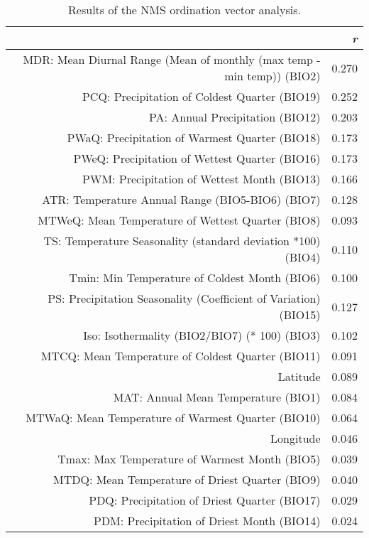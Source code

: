 \begin{table}[ht]
\centering
\begin{tabular}{rr}
  \hline
 & {\emph{r}} \\ 
  \hline
MDR: Mean Diurnal Range (Mean of monthly (max temp - min temp)) (BIO2) & 0.270 \\ 
  PCQ: Precipitation of Coldest Quarter (BIO19) & 0.252 \\ 
  PA: Annual Precipitation (BIO12) & 0.203 \\ 
  PWaQ: Precipitation of Warmest Quarter (BIO18) & 0.173 \\ 
  PWeQ: Precipitation of Wettest Quarter (BIO16) & 0.173 \\ 
  PWM: Precipitation of Wettest Month (BIO13) & 0.166 \\ 
  ATR: Temperature Annual Range (BIO5-BIO6) (BIO7) & 0.128 \\ 
  MTWeQ: Mean Temperature of Wettest Quarter (BIO8) & 0.093 \\ 
  TS: Temperature Seasonality (standard deviation *100) (BIO4) & 0.110 \\ 
  Tmin: Min Temperature of Coldest Month (BIO6) & 0.100 \\ 
  PS: Precipitation Seasonality (Coefficient of Variation) (BIO15) & 0.127 \\ 
  Iso: Isothermality (BIO2/BIO7) (* 100) (BIO3) & 0.102 \\ 
  MTCQ: Mean Temperature of Coldest Quarter (BIO11) & 0.091 \\ 
  Latitude & 0.089 \\ 
  MAT: Annual Mean Temperature (BIO1) & 0.084 \\ 
  MTWaQ: Mean Temperature of Warmest Quarter (BIO10) & 0.064 \\ 
  Longitude & 0.046 \\ 
  Tmax: Max Temperature of Warmest Month (BIO5) & 0.039 \\ 
  MTDQ: Mean Temperature of Driest Quarter (BIO9) & 0.040 \\ 
  PDQ: Precipitation of Driest Quarter (BIO17) & 0.029 \\ 
  PDM: Precipitation of Driest Month (BIO14) & 0.024 \\ 
   \hline
\end{tabular}
\caption{Results of the NMS ordination vector analysis.} 
\label{tab:wc_vec}
\end{table}
